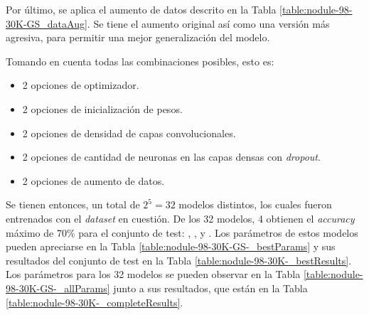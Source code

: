 \begin{table}[h]
\centering
{}
\caption[Nodule-98-30K-GS-*: Aumento de datos]{, aumento de datos utilizado.}
\label{table:nodule-98-30K-GS_dataAug}
\end{table}

Por último, se aplica el aumento de datos descrito en la Tabla \ref{table:nodule-98-30K-GS_dataAug}. Se tiene el aumento original así como una versión más agresiva, para permitir una mejor generalización del modelo.

Tomando en cuenta todas las combinaciones posibles, esto es:
\begin{itemize}
    \item 2 opciones de optimizador.
    \item 2 opciones de inicialización de pesos.
    \item 2 opciones de densidad de capas convolucionales.
    \item 2 opciones de cantidad de neuronas en las capas densas con \textit{dropout}.
    \item 2 opciones de aumento de datos.
\end{itemize}

Se tienen entonces, un total de $2^5=32$ modelos distintos, los cuales fueron entrenados con el \textit{dataset} en cuestión. De los 32 modelos, 4 obtienen el \textit{accuracy} máximo de 70\% para el conjunto de test: , ,  y . Los parámetros de estos modelos pueden apreciarse en la Tabla \ref{table:nodule-98-30K-GS-_bestParams} y sus resultados del conjunto de test en la Tabla \ref{table:nodule-98-30K-_bestResults}. Los parámetros para los 32 modelos se pueden observar en la Tabla \ref{table:nodule-98-30K-GS-_allParams} junto a sus resultados, que están en la Tabla \ref{table:nodule-98-30K-_completeResults}.

